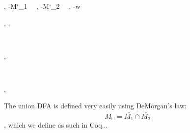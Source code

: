 \documentclass[a4paper]{article}
\begin{document}
\begin{alectryon}
\begin{sentence}
\begin{output}
\begin{goals}
\begin{extragoals}
\begin{goal}
\begin{hyps}
              \sep
              \hyp{M\char`\_1}{~~}
              \sep
              \hyp{M\char`\_2}{~~}
              \sep
              \hyp{w}{~}
            \end{hyps}
            \sep
            \infrule{}
            \sep
            \begin{conclusion}
              ~~~~~~~~~\nl
              ~~~~~~~~~\nl
              ~~~\nl
              ~~~~~\nl
              ~~~~~~~~~~~
            \end{conclusion}
          \end{goal}
        \end{extragoals}
      \end{goals}
    \end{output}
  \end{sentence}
  \sep
  \begin{sentence}
    \begin{input}
      ~~~\nl
      ~~~~~~~~\nl
      ~~~~~~~~\nl
    \end{input}
  \end{sentence}
  \sep
  \begin{sentence}
    \begin{input}
    \end{input}
  \end{sentence}
\end{alectryon}

The union DFA is defined very easily using DeMorgan's law:
%
\begin{equation*}
M_\cup = \overline{\overline{M_1} \cap \overline{M_2}}
\end{equation*}
, which we define as such in Coq...
\end{document}
